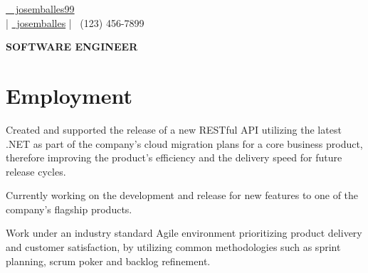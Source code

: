 \documentclass[]{deedy-resume}
\begin{document}
%
%
\lastupdated

%
%


{\href{https://github.com/josemballes99}{\faGithubSquare\ \, josemballes99} \\
\href{mailto: test@test.com}  | \href{https://www.linkedin.com/in/josemballes/}{\faLinkedinSquare \, josemballes}  | {\faMobile \, (123) 456-7899} 
}


\begin{center}
\huge\color{subheadings}\bf{SOFTWARE ENGINEER}
\end{center}

\section{Employment}

\vspace{\topsep} %
\begin{tightemize}
\item Created and supported the release of a new RESTful API utilizing the latest .NET as part of the company's cloud migration plans for a core business product, therefore improving the product's efficiency and the delivery speed for future release cycles.
\item Currently working on the development and release for new features to one of the company's flagship products.
\item Work under an industry standard Agile environment prioritizing product delivery and customer satisfaction, by utilizing common methodologies such as sprint planning, scrum poker and backlog refinement.
\end{tightemize}
\sectionsep
\end{document}
